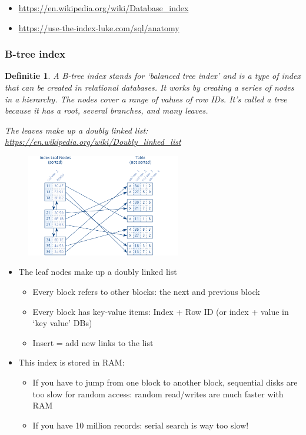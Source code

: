 \documentclass{article}
\newtheorem{theorem}{Definitie}[section]
\begin{document}
\begin{itemize}
    \item \url{https://en.wikipedia.org/wiki/Database_index}
    \item \url{https://use-the-index-luke.com/sql/anatomy}
\end{itemize}

\subsubsection{B-tree index}

\begin{theorem}
    A B-tree index stands for `balanced tree index' and is a type of index that can be created in relational databases.
    It works by creating a series of nodes in a hierarchy. The nodes cover a range of values of row IDs. 
    It’s called a tree because it has a root, several branches, and many leaves.
    
    The leaves make up a doubly linked list: \url{https://en.wikipedia.org/wiki/Doubly_linked_list}
    
\end{theorem}

\begin{figure}[H]
    \centering
    \includegraphics[width=0.6\textwidth]{b-tree-index.png}
    \caption{}
\end{figure}

\begin{itemize}
    \item The leaf nodes make up a doubly linked list
    \begin{itemize}
        \item Every block refers to other blocks: the next and previous block
        \item Every block has key-value items: Index + Row ID (or index + value in `key value' DBs)
        \item Insert = add new links to the list
    \end{itemize}
    \item This index is stored in RAM:
    \begin{itemize}
        \item If you have to jump from one block to another block, sequential disks are too slow for random access: random read/writes are much faster with RAM
        \item If you have 10 million records: serial search is way too slow!
    \end{itemize}
\end{itemize}
\end{document}
